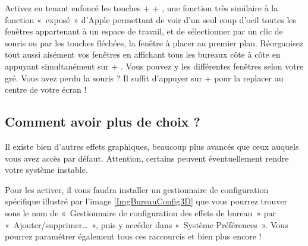 Activez en tenant enfoncé les touches  +  + , une fonction très similaire à la fonction «~exposé~» d'Apple permettant de voir d'un seul coup d'oeil toutes les fenêtres appartenant à un espace de travail, et de sélectionner par un clic de souris ou par les touches fléchées, la fenêtre à placer au premier plan. Réorganisez tout aussi aisément vos fenêtres en affichant tous les bureaux côte à côte en appuyant simultanément sur  + . Vous pouvez y  les différentes fenêtres selon votre gré.
Vous avez perdu la souris ? Il suffit d'appuyer sur  +  pour la replacer au centre de votre écran !
\subsection{Comment avoir plus de choix ?}
Il existe bien d'autres effets graphiques, beaucoup plus avancés que ceux auquels vous avez accès par défaut. Attention, certains peuvent éventuellement rendre votre système instable.\par
Pour les activer, il vous faudra installer un gestionnaire de configuration spécifique illustré par l'image \ref{ImgBureauConfig3D} que vous pourrez trouver sous le nom de «~Gestionnaire de configuration des effets de bureau~» par «~Ajouter/supprimer\dots{}~», puis y accéder dans «~Système \FlecheDroite Préférences~». Vous pourrez paramétrer également tous ces raccourcis et bien plus encore !\par
{}
